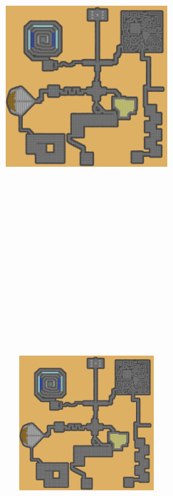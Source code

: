 \documentclass[a4paper, landscape]{article}
\begin{document}
	\begin{multicols}{4}
		\begin{figure}[H]
\includegraphics[trim = 4387 2540 490 1864, clip, height = 19cm, width = 6cm]{Dungeon_playersmap.png}
		\end{figure}
		\begin{figure}[H]
\includegraphics[trim = 4387 2395 490 2532, clip, height = 5cm, width = 6cm]{Dungeon_playersmap.png}

\end{figure}
\end{multicols}
\end{document}
